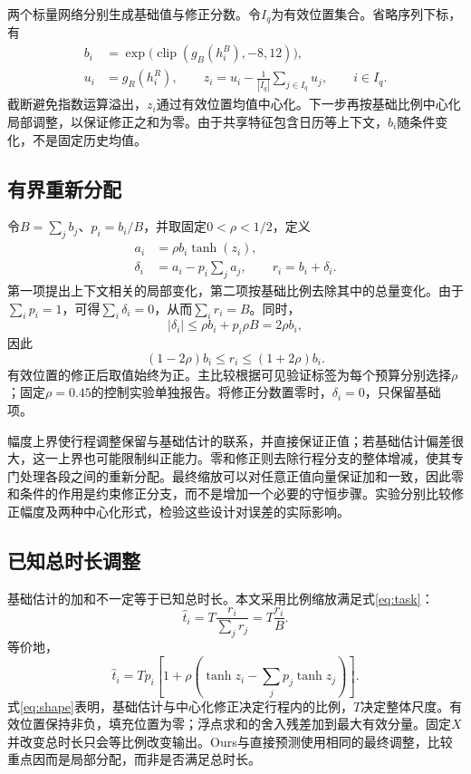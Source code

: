 两个标量网络分别生成基础值与修正分数。令$I_q$为有效位置集合。省略序列下标，有
\begin{align}
b_i&=\exp\bigl(\operatorname{clip}(g_B(h^B_i),-8,12)\bigr),\\
u_i&=g_R(h^R_i),\qquad
z_i=u_i-\frac1{|I_q|}\sum_{j\in I_q}u_j,\qquad i\in I_q.
\label{eq:heads}
\end{align}
截断避免指数运算溢出，$z_i$通过有效位置均值中心化。下一步再按基础比例中心化局部调整，以保证修正之和为零。由于共享特征包含日历等上下文，$b_i$随条件变化，不是固定历史均值。

\subsection{有界重新分配}
令$B=\sum_jb_j$、$p_i=b_i/B$，并取固定$0<\rho<1/2$，定义
\begin{align}
a_i&=\rho b_i\tanh(z_i),\\
\delta_i&=a_i-p_i\sum_j a_j,\qquad r_i=b_i+\delta_i.
\label{eq:redistribution}
\end{align}
第一项提出上下文相关的局部变化，第二项按基础比例去除其中的总量变化。由于$\sum_ip_i=1$，可得$\sum_i\delta_i=0$，从而$\sum_ir_i=B$。同时，
\begin{equation}
|\delta_i|\leq\rho b_i+p_i\rho B=2\rho b_i,
\end{equation}
因此
\begin{equation}
(1-2\rho)b_i\leq r_i\leq(1+2\rho)b_i.
\label{eq:positive}
\end{equation}
有效位置的修正后取值始终为正。主比较根据可见验证标签为每个预算分别选择$\rho$；固定$\rho=0.45$的控制实验单独报告。将修正分数置零时，$\delta_i=0$，只保留基础项。

幅度上界使行程调整保留与基础估计的联系，并直接保证正值；若基础估计偏差很大，这一上界也可能限制纠正能力。零和修正则去除行程分支的整体增减，使其专门处理各段之间的重新分配。最终缩放可以对任意正值向量保证加和一致，因此零和条件的作用是约束修正分支，而不是增加一个必要的守恒步骤。实验分别比较修正幅度及两种中心化形式，检验这些设计对误差的实际影响。

\subsection{已知总时长调整}
基础估计的加和不一定等于已知总时长。本文采用比例缩放满足式\eqref{eq:task}：
\begin{equation}
\hat t_i=T\frac{r_i}{\sum_jr_j}=T\frac{r_i}{B}.
\label{eq:rescaling}
\end{equation}
等价地，
\begin{equation}
\hat t_i=T p_i\left[1+\rho\left(\tanh z_i-\sum_jp_j\tanh z_j\right)\right].
\label{eq:shape}
\end{equation}
式\eqref{eq:shape}表明，基础估计与中心化修正决定行程内的比例，$T$决定整体尺度。有效位置保持非负，填充位置为零；浮点求和的舍入残差加到最大有效分量。固定$X$并改变总时长只会等比例改变输出。Ours与直接预测使用相同的最终调整，比较重点因而是局部分配，而非是否满足总时长。

